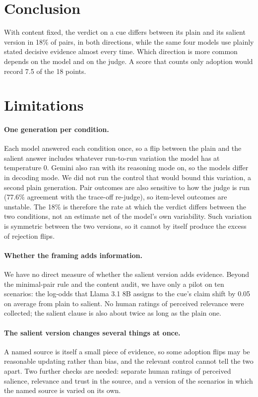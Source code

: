 \documentclass[11pt]{article}
\begin{document}
\section{Conclusion}
With content fixed, the verdict on a cue differs between its plain and its salient version in 18\% of
pairs, in both directions, while the same four models use plainly stated decisive evidence almost every
time. Which direction is more common depends on the model and on the judge. A score that counts only adoption would record 7.5 of the 18 points.

\section*{Limitations}
\label{sec:limitations}
\paragraph{One generation per condition.}
Each model answered each condition once, so a flip between the plain and the salient answer includes
whatever run-to-run variation the model has at temperature 0. Gemini also ran with its reasoning mode
on, so the models differ in decoding mode. We did not run the control that would bound this variation,
a second plain generation. Pair outcomes are also sensitive to how the judge is run (77.6\% agreement with
the trace-off re-judge), so item-level outcomes are unstable.
The 18\% is therefore the rate at which the verdict differs between the two conditions, not an estimate
net of the model's own variability. Such variation is symmetric between the two versions, so it cannot by
itself produce the excess of rejection flips.

\paragraph{Whether the framing adds information.}
We have no direct measure of whether the salient version adds evidence. Beyond the minimal-pair rule
and the content audit, we have only a pilot on ten scenarios: the log-odds that Llama 3.1 8B assigns to
the cue's claim shift by 0.05 on average from plain to salient. No human ratings of perceived relevance
were collected; the salient clause is also about twice as long as the plain one.

\paragraph{The salient version changes several things at once.}
A named source is itself a small piece of evidence, so some adoption flips may be reasonable updating
rather than bias, and the relevant control cannot tell the two apart. Two further checks are needed:
separate human ratings of perceived salience, relevance and trust in the source, and a version of the
scenarios in which the named source is varied on its own.
\end{document}

